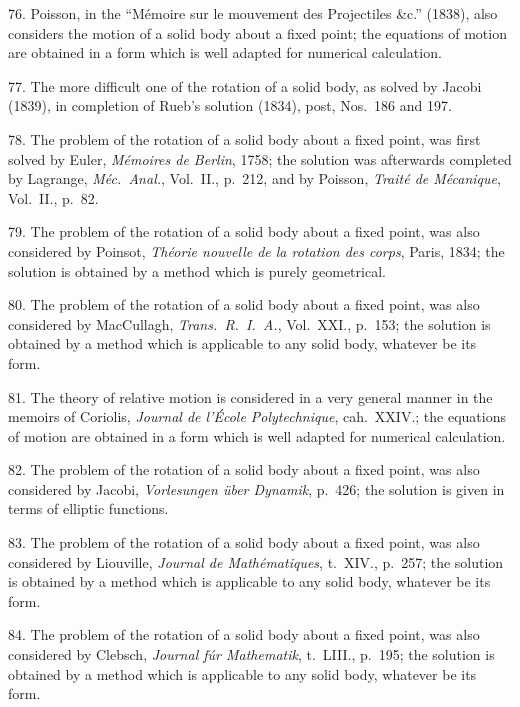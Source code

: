 \documentclass[11pt,a4paper]{book}
\begin{document}
76. Poisson, in the ``M\'emoire sur le mouvement des Projectiles \&c.'' (1838), also considers the motion of a solid body about a fixed point; the equations of motion are obtained in a form which is well adapted for numerical calculation.

77. The more difficult one of the rotation of a solid body, as solved by Jacobi (1839), in completion of Rueb's solution (1834), post, Nos.~186 and 197.

78. The problem of the rotation of a solid body about a fixed point, was first solved by Euler, \textit{M\'emoires de Berlin}, 1758; the solution was afterwards completed by Lagrange, \textit{M\'ec.\ Anal.}, Vol.~II., p.~212, and by Poisson, \textit{Trait\'e de M\'ecanique}, Vol.~II., p.~82.

\newpage
\setcounter{page}{535}

79. The problem of the rotation of a solid body about a fixed point, was also considered by Poinsot, \textit{Th\'eorie nouvelle de la rotation des corps}, Paris, 1834; the solution is obtained by a method which is purely geometrical.

80. The problem of the rotation of a solid body about a fixed point, was also considered by MacCullagh, \textit{Trans.\ R.\ I.\ A.}, Vol.~XXI., p.~153; the solution is obtained by a method which is applicable to any solid body, whatever be its form.

81. The theory of relative motion is considered in a very general manner in the memoirs of Coriolis, \textit{Journal de l'\'Ecole Polytechnique}, cah.~XXIV.; the equations of motion are obtained in a form which is well adapted for numerical calculation.

82. The problem of the rotation of a solid body about a fixed point, was also considered by Jacobi, \textit{Vorlesungen \"uber Dynamik}, p.~426; the solution is given in terms of elliptic functions.

83. The problem of the rotation of a solid body about a fixed point, was also considered by Liouville, \textit{Journal de Math\'ematiques}, t.~XIV., p.~257; the solution is obtained by a method which is applicable to any solid body, whatever be its form.

84. The problem of the rotation of a solid body about a fixed point, was also considered by Clebsch, \textit{Journal f\'ur Mathematik}, t.~LIII., p.~195; the solution is obtained by a method which is applicable to any solid body, whatever be its form.

\newpage
\setcounter{page}{540}
\end{document}
